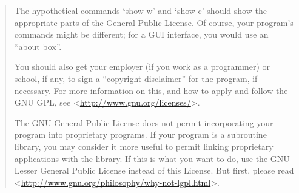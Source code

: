 \documentclass[letterpaper,10pt,english]{sphinxmanual}
\begin{document}
\begin{quote}
The hypothetical commands {\color{red}\bfseries{}{}`}show w' and {\color{red}\bfseries{}{}`}show c' should show the appropriate
parts of the General Public License.  Of course, your program's commands
might be different; for a GUI interface, you would use an ``about box''.

You should also get your employer (if you work as a programmer) or school,
if any, to sign a ``copyright disclaimer'' for the program, if necessary.
For more information on this, and how to apply and follow the GNU GPL, see
\textless{}\href{http://www.gnu.org/licenses/}{http://www.gnu.org/licenses/}\textgreater{}.

The GNU General Public License does not permit incorporating your program
into proprietary programs.  If your program is a subroutine library, you
may consider it more useful to permit linking proprietary applications with
the library.  If this is what you want to do, use the GNU Lesser General
Public License instead of this License.  But first, please read
\textless{}\href{http://www.gnu.org/philosophy/why-not-lgpl.html}{http://www.gnu.org/philosophy/why-not-lgpl.html}\textgreater{}.
\end{quote}



\renewcommand{\indexname}{Index}
\printindex
\end{document}
